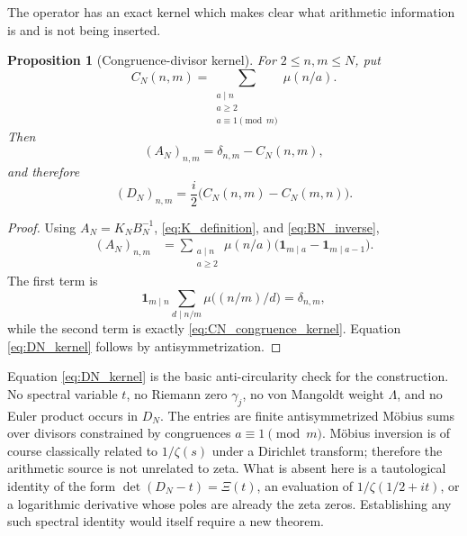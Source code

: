 \documentclass[11pt]{amsart}
\numberwithin{equation}{section}
\theoremstyle{plain}
\newtheorem{proposition}[theorem]{Proposition}
\theoremstyle{definition}
\theoremstyle{remark}
\newcommand{\one}{\mathbf 1}
\newcommand{\mob}{\mu}
\begin{document}
The operator has an exact kernel which makes clear what arithmetic information is and is not being inserted.

\begin{proposition}[Congruence-divisor kernel]
\label{prop:AN_congruence_kernel}
For $2\le n,m\le N$, put
\begin{equation}
C_N(n,m)=
\sum_{\substack{a\mid n\\a\ge2\\a\equiv1\pmod m}}
\mob(n/a).
\label{eq:CN_congruence_kernel}
\end{equation}
Then
\begin{equation}
(A_N)_{n,m}=\delta_{n,m}-C_N(n,m),
\label{eq:AN_kernel}
\end{equation}
and therefore
\begin{equation}
(D_N)_{n,m}
=\frac{i}{2}\bigl(C_N(n,m)-C_N(m,n)\bigr).
\label{eq:DN_kernel}
\end{equation}
\end{proposition}

\begin{proof}
Using $A_N=K_NB_N^{-1}$, \eqref{eq:K_definition}, and \eqref{eq:BN_inverse},
\begin{align}
(A_N)_{n,m}
&=\sum_{\substack{a\mid n\\a\ge2}}
\mob(n/a)
\bigl(\one_{m\mid a}-\one_{m\mid a-1}\bigr).
\label{eq:AN_kernel_expand}
\end{align}
The first term is
\begin{equation}
\one_{m\mid n}
\sum_{d\mid n/m}\mob\bigl((n/m)/d\bigr)
=\delta_{n,m},
\label{eq:AN_delta_term}
\end{equation}
while the second term is exactly \eqref{eq:CN_congruence_kernel}.  Equation \eqref{eq:DN_kernel} follows by antisymmetrization.
\end{proof}

Equation \eqref{eq:DN_kernel} is the basic anti-circularity check for the construction.  No spectral variable $t$, no Riemann zero $\gamma_j$, no von Mangoldt weight $\Lambda$, and no Euler product occurs in $D_N$.  The entries are finite antisymmetrized Möbius sums over divisors constrained by congruences $a\equiv1\pmod m$.  Möbius inversion is of course classically related to $1/\zeta(s)$ under a Dirichlet transform; therefore the arithmetic source is not unrelated to zeta.  What is absent here is a tautological identity of the form $\det(D_N-t)=\Xi(t)$, an evaluation of $1/\zeta(1/2+it)$, or a logarithmic derivative whose poles are already the zeta zeros.  Establishing any such spectral identity would itself require a new theorem.
\end{document}
